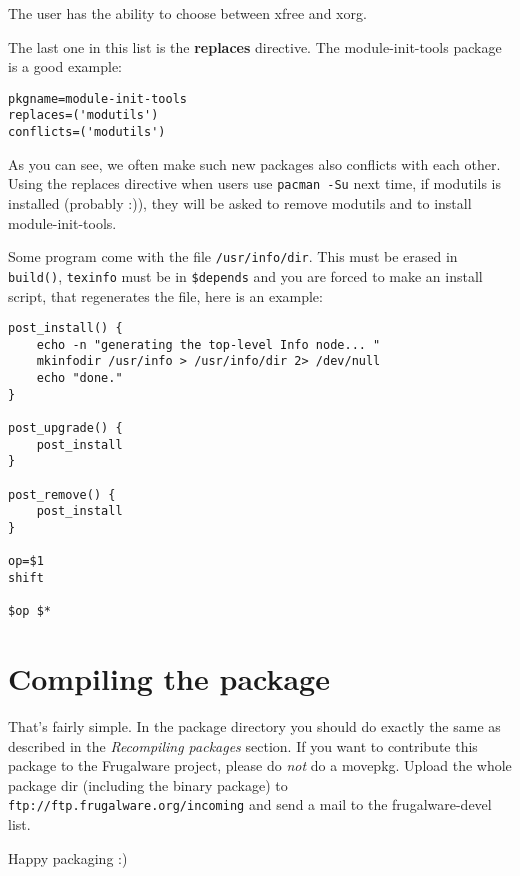 The user has the ability to choose between xfree and xorg.

The last one in this list is the \textbf{replaces} directive. The module-init-tools package is a good example:
\begin{verbatim}
pkgname=module-init-tools
replaces=('modutils')
conflicts=('modutils')
\end{verbatim}

As you can see, we often make such new packages also conflicts with each other. Using the replaces directive when users use {\tt pacman -Su} next time, if modutils is installed (probably :)), they will be asked to remove modutils and to install module-init-tools.

Some program come with the file {\tt /usr/info/dir}. This must be erased in {\tt build()}, {\tt texinfo} must be in {\tt \$depends} and you are forced to make an install script, that regenerates the file, here is an example:
\begin{verbatim}
post_install() {
	echo -n "generating the top-level Info node... "
	mkinfodir /usr/info > /usr/info/dir 2> /dev/null
	echo "done."
}

post_upgrade() {
	post_install
}

post_remove() {
	post_install
}

op=$1
shift

$op $*
\end{verbatim}

\section{Compiling the package}

That's fairly simple. In the package directory you should do exactly the same as described in the \textit{Recompiling packages} section. If you want to contribute this package to the Frugalware project, please do \textit{not} do a movepkg. Upload the whole package dir (including the binary package) to {\tt ftp://ftp.frugalware.org/incoming} and send a mail to the frugalware-devel list.

Happy packaging :)